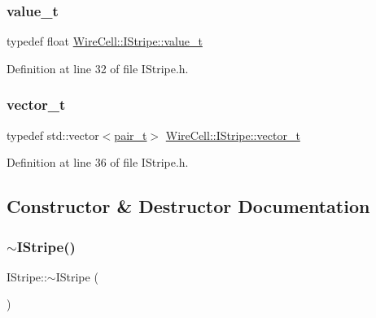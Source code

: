 \mbox{\label{class_wire_cell_1_1_i_stripe_af0dd73bc2517c2c848c24ea56caefde6}} 
\subsubsection{\texorpdfstring{value\+\_\+t}{value\_t}}
{\footnotesize\ttfamily typedef float \hyperlink{class_wire_cell_1_1_i_stripe_af0dd73bc2517c2c848c24ea56caefde6}{Wire\+Cell\+::\+I\+Stripe\+::value\+\_\+t}}



Definition at line 32 of file I\+Stripe.\+h.

\mbox{\label{class_wire_cell_1_1_i_stripe_af5a7b9f663e9ecbc71edfb44c989101e}} 
\subsubsection{\texorpdfstring{vector\+\_\+t}{vector\_t}}
{\footnotesize\ttfamily typedef std\+::vector$<$\hyperlink{class_wire_cell_1_1_i_stripe_a7d2b2bbfd3cd13724a7b7475f1850acd}{pair\+\_\+t}$>$ \hyperlink{class_wire_cell_1_1_i_stripe_af5a7b9f663e9ecbc71edfb44c989101e}{Wire\+Cell\+::\+I\+Stripe\+::vector\+\_\+t}}



Definition at line 36 of file I\+Stripe.\+h.



\subsection{Constructor \& Destructor Documentation}
\mbox{\label{class_wire_cell_1_1_i_stripe_a9b78345e262c75719dfdd50fd71c246d}} 
\subsubsection{\texorpdfstring{$\sim$\+I\+Stripe()}{~IStripe()}}
{\footnotesize\ttfamily I\+Stripe\+::$\sim$\+I\+Stripe (\begin{DoxyParamCaption}{ }\end{DoxyParamCaption})\hspace{0.3cm}{\ttfamily [virtual]}}



